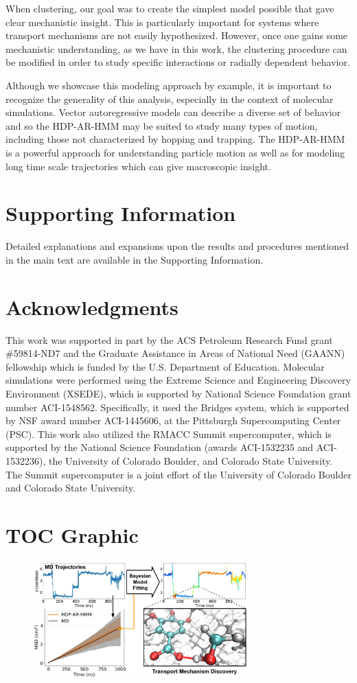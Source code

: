 \documentclass[journal=jpcbfk,manuscript=article]{achemso}
\begin{document}
  When clustering, our goal was to create the simplest model possible that gave
  clear mechanistic insight. This is particularly important for systems where transport mechanisms
  are not easily hypothesized. However, once one gains some mechanistic understanding,
  as we have in this work, the clustering procedure can be modified in order to 
  study specific interactions or radially dependent behavior.
  
  Although we showcase this modeling approach by example, it is important to
  recognize the generality of this analysis, especially in the context of molecular
  simulations. Vector autoregressive models can describe a diverse set of behavior
  and so the HDP-AR-HMM may be suited to study many types of motion, including those not 
  characterized by hopping and trapping. The HDP-AR-HMM is a powerful approach for 
  understanding particle motion as well as for modeling long time scale trajectories
  which can give macroscopic insight.
  
  \section*{Supporting Information}

  Detailed explanations and expansions upon the results and procedures mentioned in
  the main text are available in the Supporting Information. 

  \section*{Acknowledgments}

  This work was supported in part by the ACS Petroleum Research Fund
  grant \#59814-ND7 and the Graduate Assistance in Areas of National Need (GAANN) 
  fellowship which is funded by the U.S. Department of Education. 
  Molecular simulations were performed using the Extreme Science and
  Engineering Discovery Environment (XSEDE), which is supported by National
  Science Foundation grant number ACI-1548562. Specifically, it used the Bridges
  system, which is supported by NSF award number ACI-1445606, at the Pittsburgh
  Supercomputing Center (PSC). This work also utilized the RMACC Summit supercomputer,
  which is supported by the National Science Foundation (awards ACI-1532235 and
  ACI-1532236), the University of Colorado Boulder, and Colorado State
  University. The Summit supercomputer is a joint effort of the University of
  Colorado Boulder and Colorado State University.

  \clearpage

  
  
  
  \newpage

  \section*{TOC Graphic}
  
  \begin{figure}[!htb]
  \centering
  \includegraphics[width=3.25in]{hdphmm_TOC.pdf}
  \end{figure}
\end{document}

